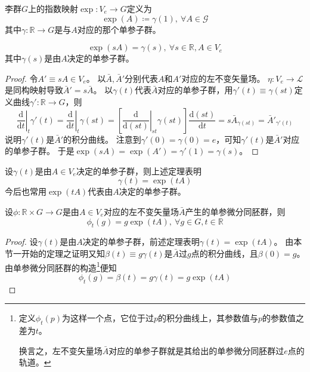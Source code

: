 \begin{definition}
    李群$G$上的指数映射$\exp \colon V_e \to G$定义为
    $$\exp(A) \coloneq \gamma(1), ~ \forall A \in \mathscr{G}$$
    其中$\gamma \colon \mathbb{R} \to G$是与$A$对应的那个单参子群。
\end{definition}

\begin{theorem}
    $$\exp(sA) = \gamma(s), ~ \forall s \in \mathbb{R}, A \in V_e$$
    其中$\gamma(s)$是由$A$决定的单参子群。
\end{theorem}

\begin{proof}
    令$A' \equiv sA \in V_e$。
    以$\bar A, \bar A'$分别代表$A$和$A'$对应的左不变矢量场。
    $\eta \colon V_e \to \mathscr{L}$是同构映射导致$\bar A' = s\bar A$。
    以$\gamma(t)$代表$\bar A$对应的单参子群，用$\gamma'(t) \equiv \gamma(st)$定义曲线$\gamma' \colon \mathbb{R} \to G$，则
    $$\left.\frac{\mathrm{d}}{\mathrm{d}t}\right|_t\gamma'(t) = \left.\frac{\mathrm{d}}{\mathrm{d}t}\right|_t\gamma(st) = \left[\left.\frac{\mathrm{d}}{\mathrm{d}(st)}\right|_{st}\gamma(st)\right]\frac{\mathrm{d}(st)}{\mathrm{d}t} = s\bar A_{\gamma(st)} = \bar A'_{\gamma'(t)}$$
    说明$\gamma'(t)$是$\bar A'$的积分曲线。
    注意到$\gamma'(0) = \gamma(0) = e$，可知$\gamma'(t)$是$\bar A'$对应的单参子群。
    于是$\exp(sA) = \exp(A') = \gamma'(1) = \gamma(s)$。
\end{proof}

\begin{note}
    设$\gamma(t)$是由$A \in V_e$决定的单参子群，则上述定理表明
    $$\gamma(t) = \exp(tA)$$
    今后也常用$\exp(tA)$代表由$A$决定的单参子群。
\end{note}

\begin{theorem}
    设$\phi \colon \mathbb{R} \times G \to G$是由$A \in V_e$对应的左不变矢量场$\bar A$产生的单参微分同胚群，则
    $$\phi_t(g) = g\exp(tA), ~ \forall g \in G, t \in \mathbb{R}$$
\end{theorem}

\begin{proof}
    设$\gamma(t)$是由$A$决定的单参子群，前述定理表明$\gamma(t) = \exp(tA)$。
    由本节一开始的定理之证明又知$\beta(t) \equiv g\gamma(t)$是$\bar A$过$g$点的积分曲线，且$\beta(0) = g$。
    由单参微分同胚群的构造\footnote{
        定义$\phi_t(p)$为这样一个点，它位于过$p$的积分曲线上，其参数值与$p$的参数值之差为$t$。
        
        换言之，左不变矢量场$\bar A$对应的单参子群就是其给出的单参微分同胚群过$e$点的轨道。
    }便知
    $$\phi_t(g) = \beta(t) = g\gamma(t) = g\exp(tA)$$
\end{proof}


